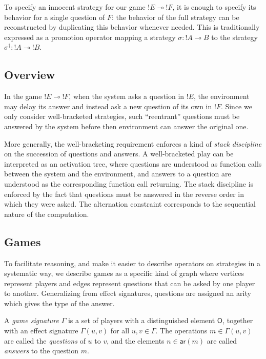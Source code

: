 \documentclass[sigplan,screen]{acmart}
\newcommand{\kw}[1]{\ensuremath{ \mathsf{#1} }}
\begin{document}
To specify an innocent strategy
for our game ${!E} \multimap {!F}$,
it is enough to specify its behavior
for a single question of $F$:
the behavior of the full strategy can be reconstructed
by duplicating this behavior whenever needed.
This is traditionally expressed as a promotion operator
mapping a strategy $\sigma : {!A} \multimap B$
to the strategy $\sigma^\dagger : {!A} \multimap {!B}$.


\subsection{Overview} %
\label{sec:arrow}

In the game ${!E} \multimap {!F}$,
when the system asks a question in ${!E}$,
the environment may delay its answer
and instead ask a new question of its own in ${!F}$.
Since we only consider well-bracketed strategies,
such ``reentrant'' questions must be answered by the system
before then environment can answer the original one.

More generally,
the well-bracketing requirement
enforces a kind of \emph{stack discipline}
on the succession of questions and answers.
A well-bracketed play
can be interpreted as an activation tree,
where questions are understood as function calls
between the system and the environment,
and answers to a question are understood as the
corresponding function call returning.
The stack discipline is enforced by the fact that
questions must be answered in the reverse order
in which they were asked.
The alternation constraint
corresponds to the sequential nature of the computation.


\subsection{Games} %

To facilitate reasoning,
and make it easier to describe operators on strategies
in a systematic way,
we describe games as a specific kind of graph
where vertices represent players
and edges represent questions that can be asked
by one player to another.
Generalizing from effect signatures,
questions are assigned an arity
which gives the type of the answer.

\begin{definition}
A \emph{game signature} $\Gamma$
is a set of players with a distinguished element $\kw{O}$,
together with an effect signature $\Gamma(u, v)$
for all $u, v \in \Gamma$.
The operations $m \in \Gamma(u, v)$ are called
the \emph{questions} of $u$ to $v$,
and the elements $n \in \kw{ar}(m)$ are called
\emph{answers} to the question $m$.
\end{definition}
\end{document}
